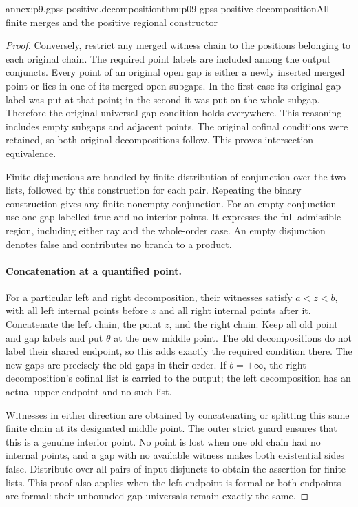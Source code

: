 \begin{annexitem}{annex:p9.gpss.positive.decomposition}{thm:p09-gpss-positive-decomposition}{All finite merges and the positive regional constructor}
\begin{proof}
Conversely, restrict any merged witness
chain to the positions belonging to each
original chain. The required point labels
are included among the output conjuncts.
Every point of an original open gap is
either a newly inserted merged point or
lies in one of its merged open subgaps.
In the first case its original gap label
was put at that point; in the second it
was put on the whole subgap. Therefore
the original universal gap condition
holds everywhere. This reasoning includes
empty subgaps and adjacent points. The
original cofinal conditions were retained,
so both original decompositions follow.
This proves intersection equivalence.

Finite disjunctions are handled by finite
distribution of conjunction over the two
lists, followed by this construction for
each pair. Repeating the binary construction
gives any finite nonempty conjunction.
For an empty conjunction use one gap
labelled true and no interior points.
It expresses the full admissible region,
including either ray and the whole-order
case. An empty disjunction denotes false
and contributes no branch to a product.

\paragraph{Concatenation at a quantified point.}
For a particular left and right decomposition,
their witnesses satisfy \(a<z<b\), with
all left internal points before \(z\)
and all right internal points after it.
Concatenate the left chain, the point
\(z\), and the right chain. Keep all
old point and gap labels and put
\(\theta\) at the new middle point.
The old decompositions do not label
their shared endpoint, so this adds
exactly the required condition there.
The new gaps are precisely the old
gaps in their order. If \(b=+\infty\),
the right decomposition's cofinal list
is carried to the output; the left
decomposition has an actual upper endpoint
and no such list.

Witnesses in either direction are
obtained by concatenating or splitting
this same finite chain at its designated
middle point. The outer strict guard
ensures that this is a genuine interior
point. No point is lost when one old
chain had no internal points, and a
gap with no available witness makes
both existential sides false. Distribute
over all pairs of input disjuncts to
obtain the assertion for finite lists.
This proof also applies when the left
endpoint is formal or both endpoints
are formal: their unbounded gap
universals remain exactly the same.


\end{proof}
\end{annexitem}
